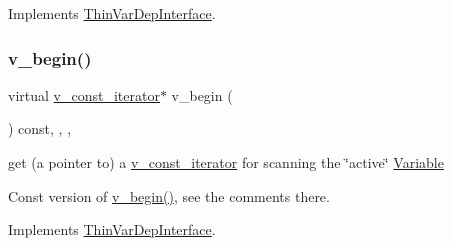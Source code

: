 Implements \mbox{\hyperlink{group___thin_var_dep_interface___c_l_a_s_s_e_s_ga645ab1f1a40dea7fdcef536081c78613}{Thin\+Var\+Dep\+Interface}}.

\mbox{\label{class_s_m_spp__di__unipi__it_1_1_linear_function_a70fe7515b94b3bb0c315ed6794f97a9a}} 
\subsubsection{\texorpdfstring{v\+\_\+begin()}{v\_begin()}\hspace{0.1cm}{\footnotesize\ttfamily [2/2]}}
{\footnotesize\ttfamily virtual \mbox{\hyperlink{class_s_m_spp__di__unipi__it_1_1_linear_function_1_1v__const__iterator}{v\+\_\+const\+\_\+iterator}}$\ast$ v\+\_\+begin (\begin{DoxyParamCaption}\item[{void}]{ }\end{DoxyParamCaption}) const\hspace{0.3cm}{\ttfamily [inline]}, {\ttfamily [final]}, {\ttfamily [override]}, {\ttfamily [virtual]}}



get (a pointer to) a \mbox{\hyperlink{class_s_m_spp__di__unipi__it_1_1_linear_function_1_1v__const__iterator}{v\+\_\+const\+\_\+iterator}} for scanning the \char`\"{}active\char`\"{} \mbox{\hyperlink{class_s_m_spp__di__unipi__it_1_1_variable}{Variable}} 

Const version of \mbox{\hyperlink{class_s_m_spp__di__unipi__it_1_1_linear_function_ab1aaddfcb091477a729de24cd07ad9e5}{v\+\_\+begin()}}, see the comments there. 

Implements \mbox{\hyperlink{group___thin_var_dep_interface___c_l_a_s_s_e_s_ga6179496ecb66b6cc1504a50bcbb264e9}{Thin\+Var\+Dep\+Interface}}.

\mbox{\label{class_s_m_spp__di__unipi__it_1_1_linear_function_a84a680d911c65c059b67cfeb63815e29}} 
